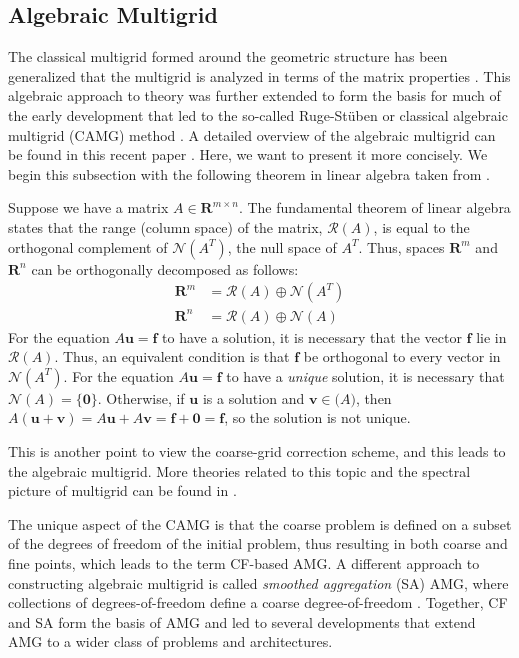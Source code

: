 \subsection{Algebraic Multigrid}
  The classical multigrid formed around the geometric structure has been generalized that the multigrid is analyzed in terms of the matrix properties \citep{mccormick1982multigrid}. This algebraic approach to theory was further extended to form the basis for much of the early development that led to the so-called Ruge-St{\"u}ben or classical algebraic multigrid (CAMG) method \citep{brandt1986algebraic,mandel1988algebraic,ruge1987algebraic}. A detailed overview of the algebraic multigrid can be found in this recent paper \citep{xu2017algebraic}. Here, we want to present it more concisely.
  We begin this subsection with the following theorem in linear algebra taken from \citep{10.5555/357695}.
\begin{theorem}
Suppose we have a matrix $A \in \mathbf{R}^{m\times n}$. The fundamental theorem of linear algebra states that the range (column space) of the matrix, $\mathcal{R}(A)$, is equal to the orthogonal
complement of $\mathcal{N}(A^T)$, the null space of ${A}^{T}$. Thus, spaces $\mathbf{R}^m$ and $\mathbf{R}^n$ can be
orthogonally decomposed as follows:
\begin{align}
    \mathbf{R}^m &= \mathcal{R}(A) \oplus \mathcal{N}(A^T)\\
     \mathbf{R}^n &= \mathcal{R}(A) \oplus \mathcal{N}(A)
\end{align}
For the equation $A\mathbf{u}=\mathbf{f}$ to have a solution, it is necessary that the vector $\mathbf{f}$ lie in $\mathcal{R}(A)$. Thus, an equivalent condition is that $\mathbf{f}$ be orthogonal to every vector in $\mathcal{N}(A^T)$. For the equation $A\mathbf{u}=\mathbf{f}$ to have a \textit{unique} solution, it is necessary that $\mathcal{N}(A) = \{\mathbf{0}\}$. 
Otherwise, if $\mathbf{u}$ is a solution and $\mathbf{v} \in \mathcal(A)$, then $A(\mathbf{u} + \mathbf{v}) = A\mathbf{u} + A\mathbf{v} = \mathbf{f} + \mathbf{0} = \mathbf{f}$, so the solution is not unique.
\end{theorem}
This is another point to view the coarse-grid correction scheme, and this leads to the algebraic multigrid. More theories related to this topic and the spectral picture of multigrid can be found in \citep{10.5555/357695}.

The unique aspect of the CAMG is that the coarse problem is defined on a subset of the degrees of freedom of the initial problem, thus resulting in both coarse and fine points, which leads to the term CF-based AMG. A different approach to constructing algebraic multigrid is called \textit{smoothed aggregation} (SA) AMG, where collections of degrees-of-freedom define a coarse degree-of-freedom \citep{vanvek1996algebraic}. Together, CF and SA form the basis of AMG and led to several developments that extend AMG to a wider class of problems and architectures.

